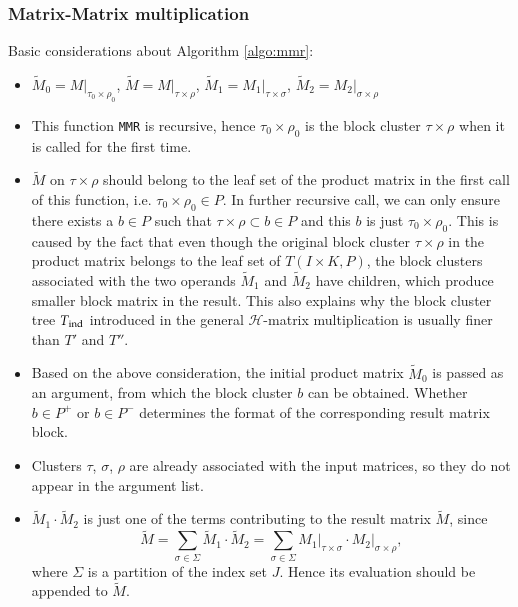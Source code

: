 \documentclass[11pt, a4paper]{article}
\begin{document}
\subsubsection{Matrix-Matrix multiplication}

Basic considerations about Algorithm \ref{algo:mmr}:
\begin{itemize}
\item $\widetilde{M}_0 = M\big\vert_{\tau_0\times\rho_0}$,
  $\widetilde{M} = M\big\vert_{\tau\times\rho}$,
  $\widetilde{M}_1 = M_1\big\vert_{\tau\times\sigma}$,
  $\widetilde{M}_2 = M_2\big\vert_{\sigma\times\rho}$
\item This function \texttt{MMR} is recursive, hence $\tau_0\times\rho_0$ is the block cluster
  $\tau\times\rho$ when it is called for the first time.
\item $\widetilde{M}$ on $\tau\times\rho$ should belong to the leaf set of the product matrix
  in the first call of this function, i.e. $\tau_0\times\rho_0 \in P$. In further recursive
  call, we can only ensure there exists a $b \in P$ such that $\tau\times\rho \subset b \in P$
  and this $b$ is just $\tau_0\times\rho_0$. This is caused by the fact that even though the
  original block cluster $\tau\times\rho$ in the product matrix belongs to the leaf set of
  $T(I\times K, P)$, the block clusters associated with the two operands $\widetilde{M}_1$ and
  $\widetilde{M}_2$ have children, which produce smaller block matrix in the result. This also
  explains why the block cluster tree $T_{\rm ind}$ introduced in the general
  $\mathcal{H}$-matrix multiplication is usually finer than $T'$ and $T''$.
\item Based on the above consideration, the initial product matrix $\widetilde{M}_0$ is passed
  as an argument, from which the block cluster $b$ can be obtained. Whether $b \in P^+$ or
  $b \in P^-$ determines the format of the corresponding result matrix block.
\item Clusters $\tau$, $\sigma$, $\rho$ are already associated with the input matrices, so
  they do not appear in the argument list.
\item $\widetilde{M}_1 \cdot \widetilde{M}_2$ is just one of the terms contributing to the
  result matrix $\widetilde{M}$, since
  $$
  \widetilde{M} = \sum_{\sigma\in\Sigma}\widetilde{M}_1 \cdot \widetilde{M}_2 =
  \sum_{\sigma\in\Sigma} M_1\big\vert_{\tau\times\sigma} \cdot
  M_2\big\vert_{\sigma\times\rho},
  $$
  where $\Sigma$ is a partition of the index set $J$. Hence its evaluation should be appended
  to $\widetilde{M}$.
\end{itemize}
\end{document}
